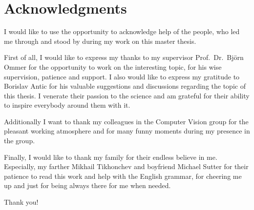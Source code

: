 
\chapter*{Acknowledgments}
\thispagestyle{empty}
I would like to use the opportunity to acknowledge help of the people, who led me through and stood by during my work on this master thesis.

First of all, I would like to express my thanks to my supervisor Prof.~Dr.~Bj\"{o}rn Ommer for the opportunity to work on the interesting topic, for his wise supervision, patience and support. I also would like to express my gratitude to Borislav Antic for his valuable suggestions and discussions regarding the topic of this thesis. I venerate their passion to the science and am grateful for their ability to inspire everybody around them with it.

Additionally I want to thank my colleagues in the Computer Vision group for the pleasant working atmosphere and for many funny moments during my presence in the group.

Finally, I would like to thank my family for their endless believe in me. Especially, my farther Mikhail Tikhonchev and boyfriend Michael Sutter for their patience to read this work and help with the English grammar, for cheering me up and just for being always there for me when needed.

Thank you!